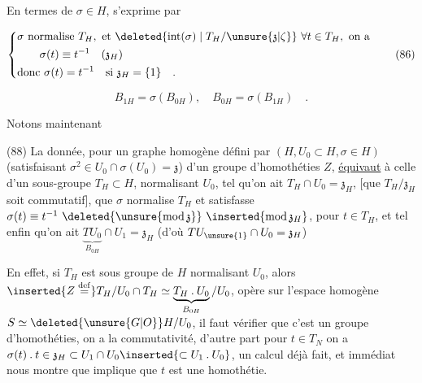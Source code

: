 En termes de $\sigma\in H$,  s'exprime par

\[
\left\{\begin{aligned}
&\sigma\text{ normalise }T_H,\text{ et }\deleted{\mathrm{int}(\sigma)\mid T_H/\unsure{\mathfrak z|\zeta}}\ \forall t\in T_H,\text{ on a}\\
&\qquad\sigma(t)\equiv t^{-1}\quad(\mathfrak z_H)\\
&\text{donc }\sigma(t)=t^{-1}\quad\text{si }\mathfrak z_H=\{1\}\quad.
\end{aligned}\right.
\tag*{(86)}
\]

\[
B_{1H}=\sigma(B_{0H}),\quad B_{0H}=\sigma(B_{1H})\quad.
\tag*{(87)}
\]

Notons maintenant

(88) La donnée,  pour un graphe homogène défini par $(H,U_0\subset H,\sigma\in H)$ (satisfaisant $\sigma^2\in U_0\cap\sigma(U_0)=\mathfrak z$) d'un groupe d'homothéties $Z$,  \uline{équivaut} à celle d'un sous-groupe $T_H\subset H$, normalisant $U_0$, tel qu'on ait $T_H\cap U_0=\mathfrak z_H$, $[$que $T_H/\mathfrak z_H$ soit commutatif$]$,  que $\sigma$ normalise $T_H$ et  satisfasse $\sigma(t)\equiv t^{-1}\ \deleted{\unsure{\mathrm{mod}\,\mathfrak z}}\ \inserted{\mathrm{mod}\,\mathfrak z_H}$, pour $t\in T_H$, et tel enfin qu'on ait $\underbrace{TU_0}_{B_{0H}}\cap U_1=\mathfrak z_H$ (d'où   $TU_{\unsure{1}}\cap U_0=\mathfrak z_H$)




En effet, si $T_H$ est  sous groupe de $H$ normalisant $U_0$, alors $\inserted{Z\overset{\mathrm{def}}{=}}T_H/U_0\cap T_H\simeq\underbrace{T_H\mathbin{.}U_0}_{B_{0H}}/U_0$, opère  sur l'espace homogène $S\simeq\deleted{\unsure{G|O}}H/U_0$, il faut vérifier que c'est un groupe d'homothéties, on a  la commutativité, d'autre part pour $t\in T_{N}$ on a $\sigma(t)\mathbin{.}t\in\mathfrak z_H\subset U_{1}\cap U_0\inserted{\subset U_1\mathbin{.}U_0}$, un calcul déjà fait, et immédiat nous montre que  implique que $t$ est une homothétie. 


